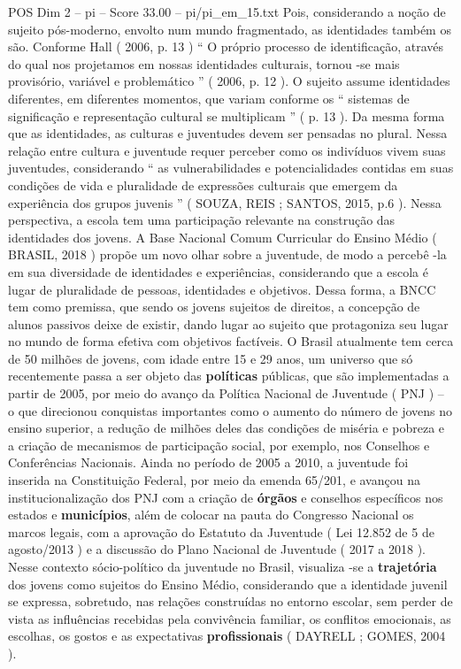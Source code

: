 \begin{textsample}{POS Dim 2 – pi – Score 33.00 – pi/pi\_em\_15.txt}
Pois, considerando a noção de sujeito pós-moderno, envolto num mundo fragmentado, as identidades também os são.
Conforme Hall ( 2006, p. 13 ) “ O próprio processo de identificação, através do qual nos projetamos em nossas identidades culturais, tornou -se mais provisório, variável e problemático ” ( 2006, p. 12 ).
O sujeito assume identidades diferentes, em diferentes momentos, que variam conforme os “ sistemas de significação e representação cultural se multiplicam ” ( p. 13 ).
Da mesma forma que as identidades, as culturas e juventudes devem ser pensadas no plural.
Nessa relação entre cultura e juventude requer perceber como os indivíduos vivem suas juventudes, considerando “ as vulnerabilidades e potencialidades contidas em suas condições de vida e pluralidade de expressões culturais que emergem da experiência dos grupos juvenis ” ( SOUZA, REIS ; SANTOS, 2015, p.6 ).
Nessa perspectiva, a escola tem uma participação relevante na construção das identidades dos jovens.
A Base Nacional Comum Curricular do Ensino Médio ( BRASIL, 2018 ) propõe um novo olhar sobre a juventude, de modo a percebê -la em sua diversidade de identidades e experiências, considerando que a escola é lugar de pluralidade de pessoas, identidades e objetivos.
Dessa forma, a BNCC tem como premissa, que sendo os jovens sujeitos de direitos, a concepção de alunos passivos deixe de existir, dando lugar ao sujeito que protagoniza seu lugar no mundo de forma efetiva com objetivos factíveis.
O Brasil atualmente tem cerca de 50 milhões de jovens, com idade entre 15 e 29 anos, um universo que só recentemente passa a ser objeto das \textbf{políticas} públicas, que são implementadas a partir de 2005, por meio do avanço da Política Nacional de Juventude ( PNJ ) – o que direcionou conquistas importantes como o aumento do número de jovens no ensino superior, a redução de milhões deles das condições de miséria e pobreza e a criação de mecanismos de participação social, por exemplo, nos Conselhos e Conferências Nacionais.
Ainda no período de 2005 a 2010, a juventude foi inserida na Constituição Federal, por meio da emenda 65/201, e avançou na institucionalização dos PNJ com a criação de \textbf{órgãos} e conselhos específicos nos estados e \textbf{municípios}, além de colocar na pauta do Congresso Nacional os marcos legais, com a aprovação do Estatuto da Juventude ( Lei 12.852 de 5 de agosto/2013 ) e a discussão do Plano Nacional de Juventude ( 2017 a 2018 ).
Nesse contexto sócio-político da juventude no Brasil, visualiza -se a \textbf{trajetória} dos jovens como sujeitos do Ensino Médio, considerando que a identidade juvenil se expressa, sobretudo, nas relações construídas no entorno escolar, sem perder de vista as influências recebidas pela convivência familiar, os conflitos emocionais, as escolhas, os gostos e as expectativas \textbf{profissionais} ( DAYRELL ; GOMES, 2004 ).

\end{textsample}
